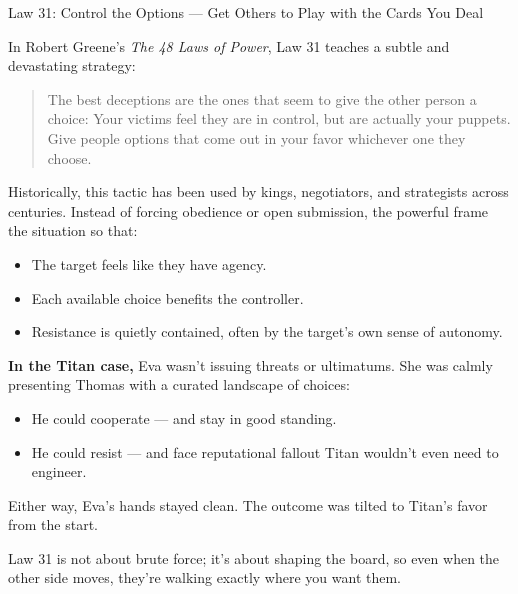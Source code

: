 \begin{HistoricalSidebar}{Law 31: Control the Options — Get Others to Play with the Cards You Deal}

    In Robert Greene’s \textit{The 48 Laws of Power}, Law 31 teaches a subtle and devastating strategy:

    \begin{quote}
        The best deceptions are the ones that seem to give the other person a choice:  
        Your victims feel they are in control, but are actually your puppets.  
        Give people options that come out in your favor whichever one they choose.
    \end{quote}
    
    Historically, this tactic has been used by kings, negotiators, and strategists across centuries.  
    Instead of forcing obedience or open submission, the powerful frame the situation so that:

    \medskip

    \begin{itemize}
        \item The target feels like they have agency.
        \item Each available choice benefits the controller.
        \item Resistance is quietly contained, often by the target’s own sense of autonomy.
    \end{itemize}
    
    \medskip
    
    \textbf{In the Titan case,} Eva wasn’t issuing threats or ultimatums.  
    She was calmly presenting Thomas with a curated landscape of choices:

    \medskip
    
    \begin{itemize}
        \item He could cooperate — and stay in good standing.
        \item He could resist — and face reputational fallout Titan wouldn’t even need to engineer.
    \end{itemize}

    \medskip
    
    Either way, Eva’s hands stayed clean.  
    The outcome was tilted to Titan’s favor from the start.
    
    \medskip
    
    Law 31 is not about brute force; it’s about shaping the board,  
    so even when the other side moves, they’re walking exactly where you want them.
    
\end{HistoricalSidebar}


